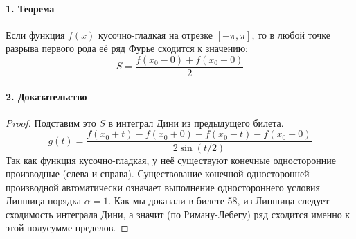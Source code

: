 \paragraph{1. Теорема}
Если функция $f(x)$ кусочно-гладкая на отрезке $[-\pi, \pi]$, то в любой точке разрыва первого рода её ряд Фурье сходится к значению:
$$ S = \frac{f(x_0-0) + f(x_0+0)}{2} $$

\paragraph{2. Доказательство}
\begin{proof}
Подставим это $S$ в интеграл Дини из предыдущего билета. 
$$ g(t) = \frac{f(x_0+t) - f(x_0+0) + f(x_0-t) - f(x_0-0)}{2 \sin(t/2)} $$
Так как функция кусочно-гладкая, у неё существуют конечные односторонние производные (слева и справа). Существование конечной односторонней производной автоматически означает выполнение одностороннего условия Липшица порядка $\alpha=1$. Как мы доказали в билете 58, из Липшица следует сходимость интеграла Дини, а значит (по Риману-Лебегу) ряд сходится именно к этой полусумме пределов.
\end{proof}

